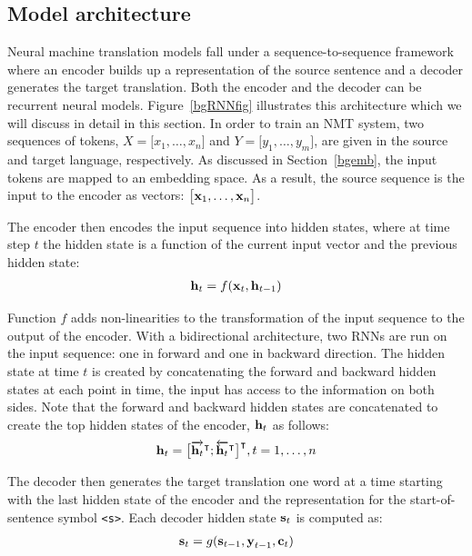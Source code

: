 \subsection{Model architecture}

Neural machine translation models fall under a sequence-to-sequence framework where an encoder builds up a representation of the source sentence and a decoder 
generates the target translation. 
Both the encoder and the decoder can be recurrent neural models.
Figure~\ref{bgRNNfig} illustrates this architecture which we will discuss in detail in this section. 
%
In order to train an NMT system, two sequences of tokens, $X =  \big[ x_1, \ldots, x_n \big] $ and $Y =  \big[ y_1, \ldots, y_m \big] $, are given in the source and target language, respectively.
As discussed in Section~\ref{bgemb}, the input tokens are mapped to an embedding space.
As a result, the source sequence is the input to the encoder as vectors: $\big[ \bm{\mathbf{x}}_1, \ldots, \bm{\mathbf{x}}_n \big]$.

The encoder then encodes the input sequence into hidden states, where at time step $t$ the hidden state is a function of the current input vector and the previous hidden state:
\begin{align}
\bm{\mathbf{h}}_t = f(\bm{\mathbf{x}}_t, \bm{\mathbf{h}}_{t-1})
\end{align}

Function $f$ adds non-linearities to the transformation of the input sequence to the output of the encoder.
With a bidirectional architecture, two RNNs are run on the input sequence: one in forward and one in backward direction. The hidden state at time $t$ is created by concatenating the forward and backward hidden states
at each point in time, the input has access to the information on both sides. 
Note that the forward and backward hidden states are concatenated to create the top hidden states of the encoder, $\bm{\mathbf{h}}_t$ as follows:
\begin{align}
\bm{\mathbf{h}}_t = \big[ \overrightarrow{\bm{\mathbf{h}}_t}^\intercal; \overleftarrow{\bm{\mathbf{h}}_t}^\intercal \big]^\intercal,      t = 1, \ldots, n
\end{align}


The decoder then generates the target translation one word at a time starting with the last hidden state of the encoder and the representation for the start-of-sentence symbol \mbox{\texttt{\textless s\textgreater}}.
Each decoder hidden state $\bm{\mathbf{s}}_t$ is computed as:
\begin{align}
\bm{\mathbf{s}}_t = g(\bm{\mathbf{s}}_{t-1}, \bm{\mathbf{y}}_{t-1}, \bm{\mathbf{c}}_t)
\end{align}

